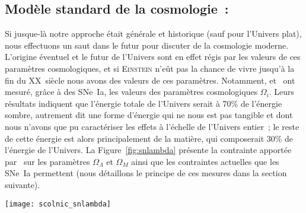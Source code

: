 \documentclass[../main/main.tex]{subfiles}
\begin{document}
\subsection{Modèle standard de la cosmologie~: \lcdm}\label{sec:MS}

Si jusque-là notre approche était générale et historique (sauf pour l'Univers
plat), nous effectuons un saut dans le futur pour discuter de la cosmologie
moderne. L'origine éventuel et le futur de l'Univers sont en effet régis par les
valeurs de ces paramètres cosmologiques, et si \textsc{Einstein} n'eût pas la
chance de vivre jusqu'à la fin du XX\ieme~siècle nous avons des valeurs de ces
paramètres. Notamment, \cite{riess1998} et~\cite{perlmutter1999} ont mesuré,
grâce à des SNe~Ia, les valeurs des paramètres cosmologiques $\Omega_i$. Leurs
résultats indiquent que l'énergie totale de l'Univers serait à 70\% de l'énergie
sombre, autrement dit une forme d'énergie qui ne nous est pas tangible et dont
nous n'avons que pu caractériser les effets à l'échelle de l'Univers entier~; le
reste de cette énergie est alors principalement de la matière, qui composerait
30\% de l'énergie de l'Univers. La Figure~\ref{fig:snlambda} présente la
contrainte apportée par~\cite{riess1998} sur les paramètres $\Omega_\Lambda$ et
$\Omega_M$ ainsi que les contraintes actuelles que les SNe~Ia permettent (nous
détaillons le principe de ces mesures dans la section suivante).

\begin{SCfigure}[1][ht]
    \centering
    \texttt{[image: scolnic\_snlambda]}
    \caption[Contraintes sur les paramètres cosmologiques $\Omega_\Lambda$ et
    $\Omega_M$ par les SNe~Ia seulement]{Contraintes sur les paramètres
        cosmologiques $\Omega_\Lambda$ et $\Omega_M$ par les SNe~Ia seulement,
        mettant en évidence l'existence de l'énergie sombre. Les contours de
        confiance à 68 et 95\% sur les paramètres sont montrés pour les mesures
        de~\cite{riess1998} (R98 Discovery Sample) et celles de l'échantillon
        Pantheon \textit{en rouge}. Figure
    de~\cite{scolnic2018}.}\label{fig:snlambda}
\end{SCfigure}
\end{document}
